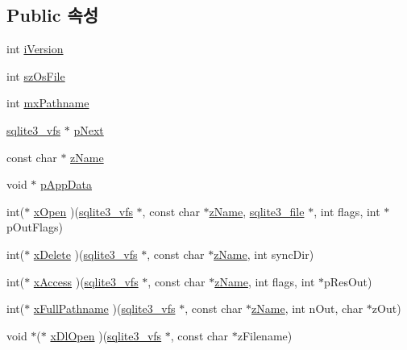 \subsection*{Public 속성}
\begin{DoxyCompactItemize}
\item 
int \hyperlink{structsqlite3__vfs_a694dd264949bd163545fe174510ed019}{i\+Version}
\item 
int \hyperlink{structsqlite3__vfs_a549399081342d61134b6398562a0a997}{sz\+Os\+File}
\item 
int \hyperlink{structsqlite3__vfs_adb2d82c74891b00b5529fb94e7710135}{mx\+Pathname}
\item 
\hyperlink{structsqlite3__vfs}{sqlite3\+\_\+vfs} $\ast$ \hyperlink{structsqlite3__vfs_ae795a4417697ecd35163f6cdf0069073}{p\+Next}
\item 
const char $\ast$ \hyperlink{structsqlite3__vfs_a0f06a27ac2201ea04c0623ef19e5d73e}{z\+Name}
\item 
void $\ast$ \hyperlink{structsqlite3__vfs_a1ba832cf207fe59c1fc8eb436524bc35}{p\+App\+Data}
\item 
int($\ast$ \hyperlink{structsqlite3__vfs_ab106b445eb5d372266a1108fc982a9aa}{x\+Open} )(\hyperlink{structsqlite3__vfs}{sqlite3\+\_\+vfs} $\ast$, const char $\ast$\hyperlink{structsqlite3__vfs_a0f06a27ac2201ea04c0623ef19e5d73e}{z\+Name}, \hyperlink{structsqlite3__file}{sqlite3\+\_\+file} $\ast$, int flags, int $\ast$p\+Out\+Flags)
\item 
int($\ast$ \hyperlink{structsqlite3__vfs_a9a84baca80b7ab2da9fb147cb40c73d2}{x\+Delete} )(\hyperlink{structsqlite3__vfs}{sqlite3\+\_\+vfs} $\ast$, const char $\ast$\hyperlink{structsqlite3__vfs_a0f06a27ac2201ea04c0623ef19e5d73e}{z\+Name}, int sync\+Dir)
\item 
int($\ast$ \hyperlink{structsqlite3__vfs_a3a5cc43f1b8a88747eb77db730ce4f69}{x\+Access} )(\hyperlink{structsqlite3__vfs}{sqlite3\+\_\+vfs} $\ast$, const char $\ast$\hyperlink{structsqlite3__vfs_a0f06a27ac2201ea04c0623ef19e5d73e}{z\+Name}, int flags, int $\ast$p\+Res\+Out)
\item 
int($\ast$ \hyperlink{structsqlite3__vfs_ae6573ffda4c4f014960b0ec3a1522dfa}{x\+Full\+Pathname} )(\hyperlink{structsqlite3__vfs}{sqlite3\+\_\+vfs} $\ast$, const char $\ast$\hyperlink{structsqlite3__vfs_a0f06a27ac2201ea04c0623ef19e5d73e}{z\+Name}, int n\+Out, char $\ast$z\+Out)
\item 
void $\ast$($\ast$ \hyperlink{structsqlite3__vfs_a4de0324cd74c8ec98e4605d432f16e0a}{x\+Dl\+Open} )(\hyperlink{structsqlite3__vfs}{sqlite3\+\_\+vfs} $\ast$, const char $\ast$z\+Filename)

\end{DoxyCompactItemize}
